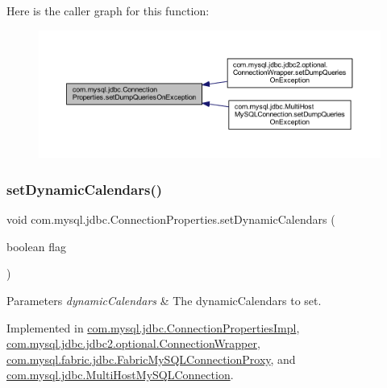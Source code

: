 Here is the caller graph for this function\+:\nopagebreak
\begin{figure}[H]
\begin{center}
\leavevmode
\includegraphics[width=350pt]{interfacecom_1_1mysql_1_1jdbc_1_1_connection_properties_a4bdf459325c8a9a96459959ea493f6a3_icgraph}
\end{center}
\end{figure}
\mbox{\label{interfacecom_1_1mysql_1_1jdbc_1_1_connection_properties_a01fd5822e9a8d49fb51172c50e3d0d31}} 
\subsubsection{\texorpdfstring{set\+Dynamic\+Calendars()}{setDynamicCalendars()}}
{\footnotesize\ttfamily void com.\+mysql.\+jdbc.\+Connection\+Properties.\+set\+Dynamic\+Calendars (\begin{DoxyParamCaption}\item[{boolean}]{flag }\end{DoxyParamCaption})}


\begin{DoxyParams}{Parameters}
{\em dynamic\+Calendars} & The dynamic\+Calendars to set. \\
\hline
\end{DoxyParams}


Implemented in \mbox{\hyperlink{classcom_1_1mysql_1_1jdbc_1_1_connection_properties_impl_a776e811b9c832597d1b8d1d0da0f7e5a}{com.\+mysql.\+jdbc.\+Connection\+Properties\+Impl}}, \mbox{\hyperlink{classcom_1_1mysql_1_1jdbc_1_1jdbc2_1_1optional_1_1_connection_wrapper_a0f42541efa793fe1588d0807c2ffab92}{com.\+mysql.\+jdbc.\+jdbc2.\+optional.\+Connection\+Wrapper}}, \mbox{\hyperlink{classcom_1_1mysql_1_1fabric_1_1jdbc_1_1_fabric_my_s_q_l_connection_proxy_a60414e228950948398eddd02d3159bb9}{com.\+mysql.\+fabric.\+jdbc.\+Fabric\+My\+S\+Q\+L\+Connection\+Proxy}}, and \mbox{\hyperlink{classcom_1_1mysql_1_1jdbc_1_1_multi_host_my_s_q_l_connection_affcca6d6db55ca52fb6b29fdba761ca8}{com.\+mysql.\+jdbc.\+Multi\+Host\+My\+S\+Q\+L\+Connection}}.

